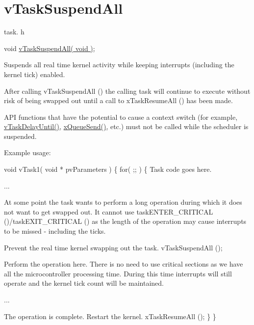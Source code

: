 \hypertarget{group__v_task_suspend_all}{\section{v\-Task\-Suspend\-All}
\label{group__v_task_suspend_all}
}
task. h 
\begin{DoxyPre}void \hyperlink{tasks_8c_a084d232640bd1d04bcac0b8784417015}{vTaskSuspendAll( void )};\end{DoxyPre}


Suspends all real time kernel activity while keeping interrupts (including the kernel tick) enabled.

After calling v\-Task\-Suspend\-All () the calling task will continue to execute without risk of being swapped out until a call to x\-Task\-Resume\-All () has been made.

A\-P\-I functions that have the potential to cause a context switch (for example, \hyperlink{task_8h_a3033ef5b1abc8618ea205d1082b21bb6}{v\-Task\-Delay\-Until()}, \hyperlink{queue_8h_af7eb49d3249351176992950d9185abe9}{x\-Queue\-Send()}, etc.) must not be called while the scheduler is suspended.

Example usage\-: 
\begin{DoxyPre}
 void vTask1( void * pvParameters )
 \{
     for( ;; )
     \{
Task code goes here.\end{DoxyPre}



\begin{DoxyPre}...\end{DoxyPre}



\begin{DoxyPre}At some point the task wants to perform a long operation during
which it does not want to get swapped out.  It cannot use
taskENTER\_CRITICAL ()/taskEXIT\_CRITICAL () as the length of the
operation may cause interrupts to be missed - including the
ticks.\end{DoxyPre}



\begin{DoxyPre}Prevent the real time kernel swapping out the task.
         vTaskSuspendAll ();\end{DoxyPre}



\begin{DoxyPre}Perform the operation here.  There is no need to use critical
sections as we have all the microcontroller processing time.
During this time interrupts will still operate and the kernel
tick count will be maintained.\end{DoxyPre}



\begin{DoxyPre}...\end{DoxyPre}



\begin{DoxyPre}The operation is complete.  Restart the kernel.
         xTaskResumeAll ();
     \}
 \}
   \end{DoxyPre}
 